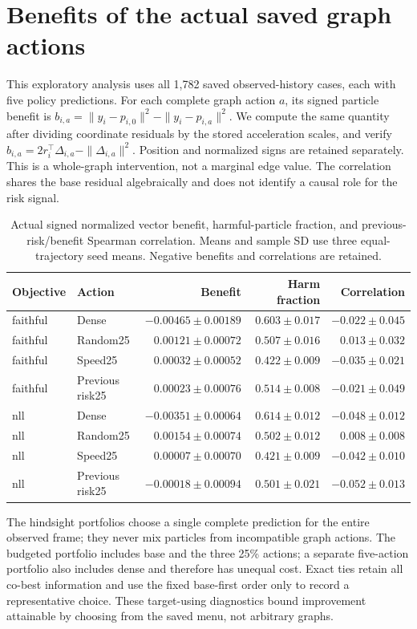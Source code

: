 \section{Benefits of the actual saved graph actions}
\label{sec:actual-action-benefit}
This exploratory analysis uses all 1,782 saved observed-history cases, each with five policy predictions.
For each complete graph action $a$, its signed particle benefit is
$b_{i,a}=\|y_i-p_{i,0}\|^2-\|y_i-p_{i,a}\|^2$.
We compute the same quantity after dividing coordinate residuals by the stored
acceleration scales, and verify $b_{i,a}=2r_i^\top\Delta_{i,a}-\|\Delta_{i,a}\|^2$.
Position and normalized signs are retained separately. This is a whole-graph
intervention, not a marginal edge value. The correlation shares the base residual
algebraically and does not identify a causal role for the risk signal.

\begin{table}[t]
\centering\small
\caption{Actual signed normalized vector benefit, harmful-particle fraction,
and previous-risk/benefit Spearman correlation. Means and sample SD use three
equal-trajectory seed means. Negative benefits and correlations are retained.}
\label{tab:actual-action-benefit}
\begin{tabular}{llrrr}
\toprule
Objective & Action & Benefit & Harm fraction & Correlation\\
\midrule
faithful & Dense & $-0.00465\pm0.00189$ & $0.603\pm0.017$ & $-0.022\pm0.045$\\
faithful & Random25 & $0.00121\pm0.00072$ & $0.507\pm0.016$ & $0.013\pm0.032$\\
faithful & Speed25 & $0.00032\pm0.00052$ & $0.422\pm0.009$ & $-0.035\pm0.021$\\
faithful & Previous risk25 & $0.00023\pm0.00076$ & $0.514\pm0.008$ & $-0.021\pm0.049$\\
nll & Dense & $-0.00351\pm0.00064$ & $0.614\pm0.012$ & $-0.048\pm0.012$\\
nll & Random25 & $0.00154\pm0.00074$ & $0.502\pm0.012$ & $0.008\pm0.008$\\
nll & Speed25 & $0.00007\pm0.00070$ & $0.421\pm0.009$ & $-0.042\pm0.010$\\
nll & Previous risk25 & $-0.00018\pm0.00094$ & $0.501\pm0.021$ & $-0.052\pm0.013$\\
\bottomrule
\end{tabular}
\end{table}

The hindsight portfolios choose a single complete prediction for the entire
observed frame; they never mix particles from incompatible graph actions.
The budgeted portfolio includes base and the three 25\% actions; a separate
five-action portfolio also includes dense and therefore has unequal cost.
Exact ties retain all co-best information and use the fixed base-first order
only to record a representative choice. These target-using diagnostics bound
improvement attainable by choosing from the saved menu, not arbitrary graphs.

